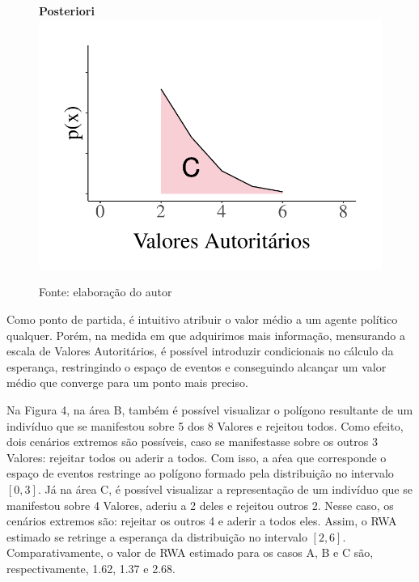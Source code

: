 \documentclass[
12pt,				%
openright,			%
twoside,			%
a4paper,			%
english,			%
french,				%
spanish,			%
brazil				%
]{abntex2}
\begin{document}
\begin{figure}[!htb]
\begin{minipage}[b]{0.4\textwidth}
	\end{minipage}
	\hspace{.05\linewidth}
\begin{minipage}[b]{0.4\textwidth}
	\textbf{Posteriori}
	\label{fig:rwa_area_max}
	\centering
	\includegraphics[width=1\linewidth]{figures/area_parcial_max_rwa}
	
\end{minipage}

Fonte: elaboração do autor
\end{figure}

Como ponto de partida, é intuitivo atribuir o valor médio a um agente político qualquer. Porém, na medida em que adquirimos mais informação, mensurando a escala de Valores Autoritários, é possível introduzir condicionais no cálculo da esperança, restringindo o espaço de eventos e conseguindo alcançar um valor médio que converge para um ponto mais preciso. 

Na Figura 4, na área B, também é possível visualizar o polígono resultante de um indivíduo que se manifestou sobre 5 dos 8 Valores e rejeitou todos. Como efeito, dois cenários extremos são possíveis, caso se manifestasse sobre os outros 3 Valores: rejeitar todos ou aderir a todos. Com isso, a aŕea que corresponde o espaço de eventos restringe ao polígono formado pela distribuição no intervalo $[0, 3]$. Já na área C, é possível visualizar a representação de um indivíduo que se manifestou sobre 4 Valores, aderiu a 2 deles e rejeitou outros 2. Nesse caso, os cenários extremos são: rejeitar os outros 4 e aderir a todos eles. Assim, o RWA estimado se retringe a esperança da distribuição no intervalo $[2, 6]$. Comparativamente, o valor de RWA estimado para os casos A, B e C são, respectivamente, 1.62, 1.37 e 2.68.
\end{document}
